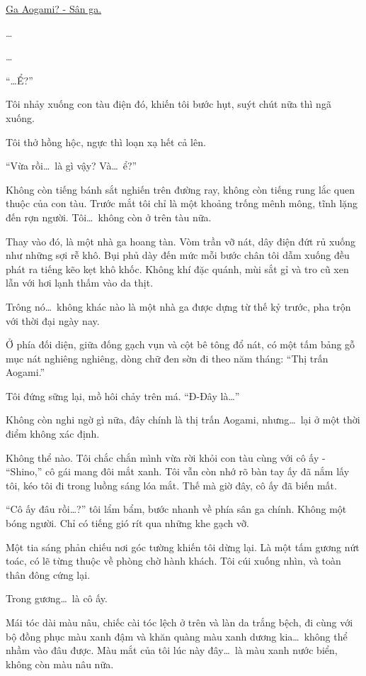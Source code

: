 \documentclass[../main.tex]{subfiles}
\begin{document}
\begin{center}
    \uline{Ga Aogami? - Sân ga.}
\end{center}

\dots

\dots

``\dots Ể?''


Tôi nhảy xuống con tàu điện đó, khiến tôi bước hụt, suýt chút nữa thì ngã xuống.

Tôi thở hồng hộc, ngực thì loạn xạ hết cả lên.

``Vừa rồi\dots\ là gì vậy? Và\dots\ ể?''

Không còn tiếng bánh sắt nghiến trên đường ray, không còn tiếng rung lắc quen thuộc của con tàu. Trước mắt tôi chỉ là một khoảng trống mênh mông, tĩnh lặng đến rợn người. Tôi\dots\ không còn ở trên tàu nữa.

Thay vào đó, là một nhà ga hoang tàn. Vòm trần vỡ nát, dây điện đứt rủ xuống như những sợi rễ khô. Bụi phủ dày đến mức mỗi bước chân tôi dẫm xuống đều phát ra tiếng kẽo kẹt khô khốc. Không khí đặc quánh, mùi sắt gỉ và tro cũ xen lẫn với hơi lạnh thấm vào da thịt.

Trông nó\dots\ không khác nào là một nhà ga được dựng từ thế kỷ trước, pha trộn với thời đại ngày nay.

Ở phía đối diện, giữa đống gạch vụn và cột bê tông đổ nát, có một tấm bảng gỗ mục nát nghiêng nghiêng, dòng chữ đen sờn đi theo năm tháng: ``Thị trấn Aogami.''

Tôi đứng sững lại, mồ hôi chảy trên má. ``Đ-Đây là\dots''

Không còn nghi ngờ gì nữa, đây chính là thị trấn Aogami, nhưng\dots\ lại ở một thời điểm không xác định.

Không thể nào. Tôi chắc chắn mình vừa rời khỏi con tàu cùng với cô ấy - ``Shino,'' cô gái mang đôi mắt xanh. Tôi vẫn còn nhớ rõ bàn tay ấy đã nắm lấy tôi, kéo tôi đi trong luồng sáng lóa mắt. Thế mà giờ đây, cô ấy đã biến mất.

``Cô ấy đâu rồi\dots?'' tôi lẩm bẩm, bước nhanh về phía sân ga chính. Không một bóng người. Chỉ có tiếng gió rít qua những khe gạch vỡ.

Một tia sáng phản chiếu nơi góc tường khiến tôi dừng lại. Là một tấm gương nứt toác, có lẽ từng thuộc về phòng chờ hành khách. Tôi cúi xuống nhìn, và toàn thân đông cứng lại.

Trong gương\dots\ là cô ấy.

Mái tóc dài màu nâu, chiếc cài tóc lệch ở trên và làn da trắng bệch, đi cùng với bộ đồng phục màu xanh đậm và khăn quàng màu xanh dương kia\dots\ không thể nhầm vào đâu được. Màu mắt của tôi lúc này đây\dots\ là màu xanh nước biển, không còn màu nâu nữa.
\end{document}

